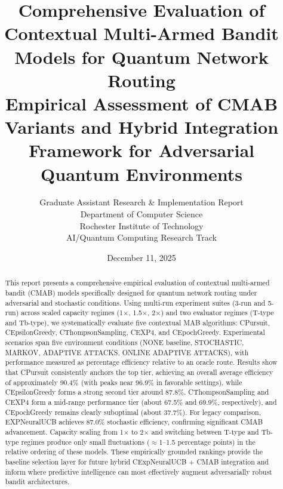 \documentclass[12pt,a4paper]{article}
\title{\textbf{Comprehensive Evaluation of Contextual Multi-Armed Bandit Models for Quantum Network Routing}\\
\large{Empirical Assessment of CMAB Variants and Hybrid Integration Framework for Adversarial Quantum Environments}}
\author{Graduate Assistant Research \& Implementation Report\\ 
Department of Computer Science \\ 
Rochester Institute of Technology \\ 
AI/Quantum Computing Research Track}
\date{December 11, 2025}
\begin{document}
\maketitle

\begin{abstract}
This report presents a comprehensive empirical evaluation of contextual multi-armed bandit (CMAB) models specifically designed for quantum network routing under adversarial and stochastic conditions. Using multi-run experiment suites (3-run and 5-run) across scaled capacity regimes (1$\times$, 1.5$\times$, 2$\times$) and two evaluator regimes (T-type and Tb-type), we systematically evaluate five contextual MAB algorithms: CPursuit, CEpsilonGreedy, CThompsonSampling, CEXP4, and CEpochGreedy. Experimental scenarios span five environment conditions (NONE baseline, STOCHASTIC, MARKOV, ADAPTIVE ATTACKS, ONLINE ADAPTIVE ATTACKS), with performance measured as percentage efficiency relative to an oracle route. Results show that CPursuit consistently anchors the top tier, achieving an overall average efficiency of approximately 90.4\% (with peaks near 96.9\% in favorable settings), while CEpsilonGreedy forms a strong second tier around 87.8\%. CThompsonSampling and CEXP4 form a mid-range performance tier (about 67.5\% and 69.9\%, respectively), and CEpochGreedy remains clearly suboptimal (about 37.7\%). For legacy comparison, EXPNeuralUCB achieves 87.0\% stochastic efficiency, confirming significant CMAB advancement. Capacity scaling from 1$\times$ to 2$\times$ and switching between T-type and Tb-type regimes produce only small fluctuations ($\approx$1--1.5 percentage points) in the relative ordering of these models. These empirically grounded rankings provide the baseline selection layer for future hybrid CExpNeuralUCB + CMAB integration and inform where predictive intelligence can most effectively augment adversarially robust bandit architectures.
\end{abstract}

\newpage
{\tableofcontents}

\newpage
\end{document}
